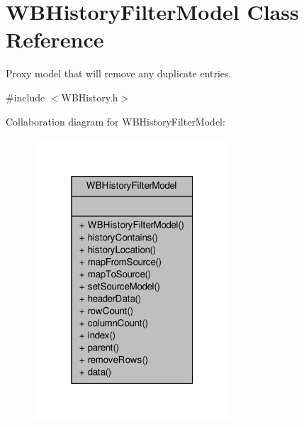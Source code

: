 \hypertarget{class_w_b_history_filter_model}{\section{W\-B\-History\-Filter\-Model Class Reference}
\label{df/d23/class_w_b_history_filter_model}
}


Proxy model that will remove any duplicate entries.  




{\ttfamily \#include $<$W\-B\-History.\-h$>$}



Collaboration diagram for W\-B\-History\-Filter\-Model\-:
\nopagebreak
\begin{figure}[H]
\begin{center}
\leavevmode
\includegraphics[width=208pt]{d6/d03/class_w_b_history_filter_model__coll__graph}
\end{center}
\end{figure}
